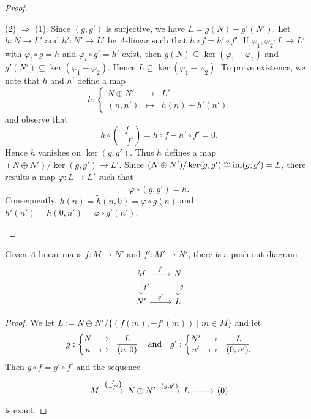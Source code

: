 \begin{proof}
\begin{addmargin}[1cm]{0cm}
\hspace*{-1cm}(2) $\Rightarrow$ (1): Since $(g,g')$ is surjective, we have $L=g(N)+g'(N')$. Let $h:N\to L'$ and $h':N'\to L'$ be $\Lambda$-linear such that $h\circ f = h'\circ f'$. If $\varphi_1,\varphi_2:L\to L'$ with $\varphi_i\circ g=h$ and $\varphi_i\circ g'=h'$ exist, then $g(N)\subseteq \ker(\varphi_1-\varphi_2)$ and $g'(N')\subseteq \ker(\varphi_1-\varphi_2)$. Hence $L\subseteq \ker(\varphi_1-\varphi_2)$.
To prove existence, we note that $h$ and $h'$ define a map
\[
\widetilde{h} :
\left\{
\begin{matrix}
N\oplus N' & \to & L' \\
(n,n') & \mapsto & h(n) + h'(n')
\end{matrix}
\right.
\]
and observe that
\[
\widetilde{h}\circ\binom{f}{-f'}=h\circ f-h'\circ f'=0.
\]
Hence $\widetilde{h}$ vanishes on $\ker(g,g')$. Thus $\widetilde{h}$ defines a map $(N\oplus N')/\ker(g,g')\to L'$. Since $(N\oplus N')/\ker(g,g')\cong \operatorname{im} (g,g')=L$, there results a map $\varphi:L\to L'$ such that
\[
\varphi\circ (g,g')=\widetilde h.
\]
Consequently, $h(n) = \widetilde{h}(n,0) = \varphi\circ g(n)$ and $h'(n') = \widetilde{h}(0,n') = \varphi\circ g'(n')$.\qedhere
\end{addmargin}
\end{proof}


\begin{corollary}\label{2.1.2}
Given $\Lambda$-linear maps $f:M\to N'$ and $f':M'\to N'$, there is a push-out diagram
\[
\begin{tikzcd}
	M\ar[r,"f"]\ar[d,"f'"] & N\ar[d,"g"] \\
	N'\ar[r,"g'"] & L	
\end{tikzcd}
\]
\end{corollary}


\begin{proof}
We let $L:=N\oplus N'/\{(f(m),-f'(m))\mid m\in M\}$ and let
\[
g :
\left\{
\begin{matrix}
N & \to & L \\
n & \mapsto & \overline{(n,0)}
\end{matrix}
\right.
\quad\text{and}\quad
g' :
\left\{
\begin{matrix}
N' & \to & L \\
n' & \mapsto & \overline{(0,n')}.
\end{matrix}
\right.
\]
Then $g\circ f=g'\circ f'$ and the sequence
\[
\begin{tikzcd}
	M \ar[r,"\binom{f}{-f'}"] & N \oplus N' \ar[r,"{(g,g')}"] & L \ar[r] & (0)
\end{tikzcd}
\]
is exact.\qedhere
\end{proof}














